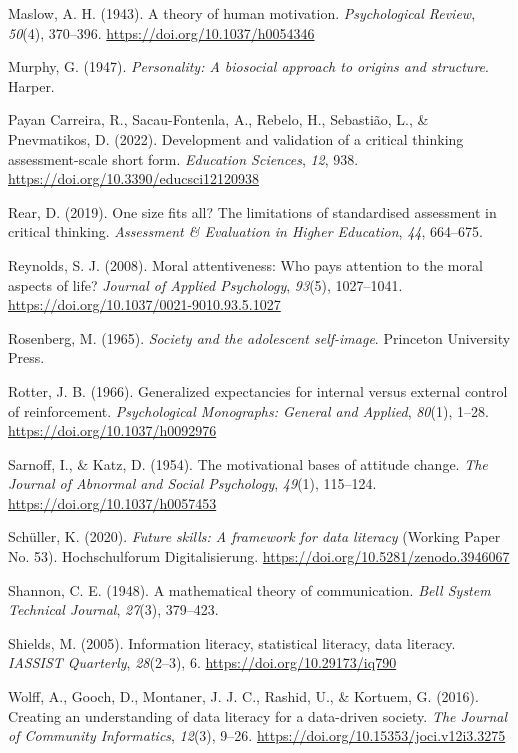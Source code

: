 \documentclass[
  12pt,
  a4paper,
  twoside]{article}
\newlength{\cslhangindent}
\newlength{\cslentryspacingunit} %
\newenvironment{CSLReferences}[2] %
 {%
  \setlength{\parindent}{0pt}
  \ifodd #1
  \let\oldpar\par
  \def\par{\hangindent=\cslhangindent\oldpar}
  \fi
  \setlength{\parskip}{#2\cslentryspacingunit}
 }%
 {}
\begin{document}
\begin{CSLReferences}{1}{0}
\leavevmode{}%
Maslow, A. H. (1943). A theory of human motivation. \emph{Psychological Review}, \emph{50}(4), 370--396. \url{https://doi.org/10.1037/h0054346}

\leavevmode{}%
Murphy, G. (1947). \emph{Personality: A biosocial approach to origins and structure}. Harper.

\leavevmode{}%
Payan Carreira, R., Sacau-Fontenla, A., Rebelo, H., Sebastião, L., \& Pnevmatikos, D. (2022). Development and validation of a critical thinking assessment-scale short form. \emph{Education Sciences}, \emph{12}, 938. \url{https://doi.org/10.3390/educsci12120938}

\leavevmode{}%
Rear, D. (2019). One size fits all? The limitations of standardised assessment in critical thinking. \emph{Assessment \& Evaluation in Higher Education}, \emph{44}, 664--675.

\leavevmode{}%
Reynolds, S. J. (2008). Moral attentiveness: Who pays attention to the moral aspects of life? \emph{Journal of Applied Psychology}, \emph{93}(5), 1027--1041. \url{https://doi.org/10.1037/0021-9010.93.5.1027}

\leavevmode{}%
Rosenberg, M. (1965). \emph{Society and the adolescent self-image}. Princeton University Press.

\leavevmode{}%
Rotter, J. B. (1966). Generalized expectancies for internal versus external control of reinforcement. \emph{Psychological Monographs: General and Applied}, \emph{80}(1), 1--28. \url{https://doi.org/10.1037/h0092976}

\leavevmode{}%
Sarnoff, I., \& Katz, D. (1954). The motivational bases of attitude change. \emph{The Journal of Abnormal and Social Psychology}, \emph{49}(1), 115--124. \url{https://doi.org/10.1037/h0057453}

\leavevmode{}%
Schüller, K. (2020). \emph{Future skills: A framework for data literacy} (Working Paper No. 53). Hochschulforum Digitalisierung. \url{https://doi.org/10.5281/zenodo.3946067}

\leavevmode{}%
Shannon, C. E. (1948). A mathematical theory of communication. \emph{Bell System Technical Journal}, \emph{27}(3), 379--423.

\leavevmode{}%
Shields, M. (2005). Information literacy, statistical literacy, data literacy. \emph{IASSIST Quarterly}, \emph{28}(2--3), 6. \url{https://doi.org/10.29173/iq790}

\leavevmode{}%
Wolff, A., Gooch, D., Montaner, J. J. C., Rashid, U., \& Kortuem, G. (2016). Creating an understanding of data literacy for a data-driven society. \emph{The Journal of Community Informatics}, \emph{12}(3), 9--26. \url{https://doi.org/10.15353/joci.v12i3.3275}

\end{CSLReferences}
\end{document}
